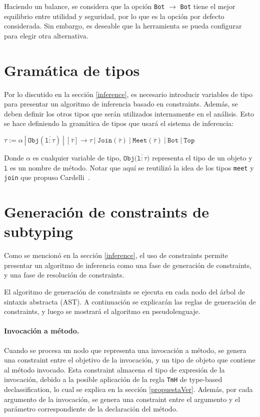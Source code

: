 Haciendo un balance, se considera que la opción \texttt{Bot} $\rightarrow$ \texttt{Bot} tiene el mejor equilibrio entre utilidad y seguridad, por lo que es la opción por defecto considerada. Sin embargo, es deseable que la herramienta se pueda configurar para elegir otra alternativa.

\section{Gramática de tipos}
Por lo discutido en la sección \ref{inference}, es necesario introducir variables de tipo para presentar un algoritmo de inferencia basado en constraints. Además, se deben definir los otros tipos que serán utilizados internamente en el análisis. Esto se hace definiendo la gramática de tipos que usará el sistema de inferencia:

  $\mathtt{\tau := \alpha\ |\ Obj(\overline{l: \tau})\ |\ [\overline{\tau}] \rightarrow \tau \ |\ Join(\overline{\tau})\ |\ Meet(\overline{\tau})\ |\ Bot\ |\ Top}$

Donde $\alpha$ es cualquier variable de tipo, $\mathtt{Obj(\overline{l: \tau}})$ representa el tipo de un objeto y $\mathtt{l}$ es un nombre de método. Notar que aquí se reutilizó la idea de los tipos \texttt{meet} y \texttt{join} que propuso Cardelli~\cite{cardelli}.

\section{Generación de constraints de subtyping} \label{propuestaGen}
Como se mencionó en la sección \ref{inference}, el uso de constraints permite presentar un algoritmo de inferencia como una fase de generación de constraints, y una fase de resolución de constraints.

El algoritmo de generación de constraints se ejecuta en cada nodo del árbol de sintaxis abstracta (AST). A continuación se explicarán las reglas de generación de constraints, y luego se mostrará el algoritmo en pseudolenguaje.

\paragraph{Invocación a método.}Cuando se procesa un nodo que representa una invocación a método, se genera una constraint entre el objetivo de la invocación, y un tipo de objeto que contiene al método invocado. Esta constraint almacena el tipo de expresión de la invocación, debido a la posible aplicación de la regla \texttt{TmH} de type-based declassification, lo cual se explica en la sección \ref{propuestaVer}. Además, por cada argumento de la invocación, se genera una constraint entre el argumento y el parámetro correspondiente de la declaración del método.

